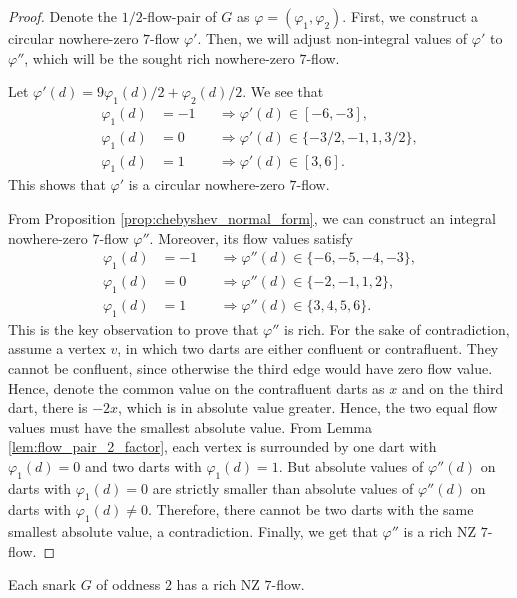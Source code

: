 \begin{proof}
Denote the $1/2$-flow-pair of $G$ as $\varphi=(\varphi_1, \varphi_2)$. First, we construct a circular nowhere-zero $7$-flow $\varphi'$. Then, we will adjust non-integral values of $\varphi'$ to $\varphi''$, which will be the sought rich nowhere-zero $7$-flow.

Let $\varphi'\left(d\right)=9\varphi_1\left(d\right)/2 + \varphi_2\left(d\right)/2$. We see that
\begin{align*}
 \varphi_1\left(d\right)&=-1&&\Rightarrow\varphi'\left(d\right)\in[-6, -3],\\
 \varphi_1\left(d\right)&=0&&\Rightarrow\varphi'\left(d\right)\in\{-3/2, -1, 1, 3/2\},\\
 \varphi_1\left(d\right)&=1&&\Rightarrow\varphi'\left(d\right)\in[3, 6].
\end{align*}
This shows that $\varphi'$ is a circular nowhere-zero $7$-flow.

From Proposition \ref{prop:chebyshev_normal_form}, we can construct an integral nowhere-zero $7$-flow $\varphi''$. Moreover, its flow values satisfy
\begin{align*}
 \varphi_1\left(d\right)&=-1&&\Rightarrow\varphi''\left(d\right)\in\{-6, -5, -4, -3\},\\
 \varphi_1\left(d\right)&=0&&\Rightarrow\varphi''\left(d\right)\in\{-2, -1, 1, 2\},\\
 \varphi_1\left(d\right)&=1&&\Rightarrow\varphi''\left(d\right)\in\{3, 4, 5, 6\}.
\end{align*}
This is the key observation to prove that $\varphi''$ is rich. For the sake of contradiction, assume a vertex $v$, in which two darts are either confluent or contrafluent. They cannot be confluent, since otherwise the third edge would have zero flow value. Hence, denote the common value on the contrafluent darts as $x$ and on the third dart, there is $-2x$, which is in absolute value greater. Hence, the two equal flow values must have the smallest absolute value. From Lemma \ref{lem:flow_pair_2_factor}, each vertex is surrounded by one dart with $\varphi_1\left(d\right)=0$ and two darts with $\varphi_1\left(d\right)=1$. But absolute values of $\varphi''\left(d\right)$ on darts with $\varphi_1\left(d\right)=0$ are strictly smaller than absolute values of $\varphi''\left(d\right)$ on darts with $\varphi_1\left(d\right)\neq 0$. Therefore, there cannot be two darts with the same smallest absolute value, a contradiction. Finally, we get that $\varphi''$ is a rich NZ $7$-flow.
\end{proof}

\begin{corollary}
Each snark $G$ of oddness $2$ has a rich NZ $7$-flow.	
\end{corollary}